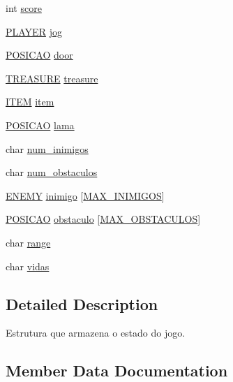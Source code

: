 \begin{DoxyCompactItemize}
\item 
int \hyperlink{structestado_a47e99ef4241dfe72d9d68244a68adb46}{score}
\item 
\hyperlink{estado_8h_a1c5dfb515f896e023ef1ab976a7d9e55}{P\+L\+A\+Y\+ER} \hyperlink{structestado_aba384d85c8fd0406b06aa2f478874bc1}{jog}
\item 
\hyperlink{estado_8h_a55b3f4b56938eeb8fa5e8f9c07baf1b0}{P\+O\+S\+I\+C\+AO} \hyperlink{structestado_a7415ebf0dc1fbc535407bb2bd669dc81}{door}
\item 
\hyperlink{estado_8h_a915d62cffb534f2a6557ce29c9c50624}{T\+R\+E\+A\+S\+U\+RE} \hyperlink{structestado_ae4cc2103608d31c5a97732cc6411334a}{treasure}
\item 
\hyperlink{structitemState}{I\+T\+EM} \hyperlink{structestado_a2c147e6348aeaa62b05ff2109f0f2bf4}{item}
\item 
\hyperlink{estado_8h_a55b3f4b56938eeb8fa5e8f9c07baf1b0}{P\+O\+S\+I\+C\+AO} \hyperlink{structestado_a85a6f9c990b282dbc2f6c68d36a4462f}{lama}
\item 
char \hyperlink{structestado_a6fbc4a80c4f371036f264ecfe27e5f9e}{num\+\_\+inimigos}
\item 
char \hyperlink{structestado_ac1a8a541e2301189833c6f713c416063}{num\+\_\+obstaculos}
\item 
\hyperlink{estado_8h_a9f02ab0e6d0d32d23cd5f9f81e8c69f9}{E\+N\+E\+MY} \hyperlink{structestado_a85c620d8bd760efde2d2681df831dcb2}{inimigo} \mbox{[}\hyperlink{estado_8h_aa97e6cbfdd94711688f1176cb8dd916a}{M\+A\+X\+\_\+\+I\+N\+I\+M\+I\+G\+OS}\mbox{]}
\item 
\hyperlink{estado_8h_a55b3f4b56938eeb8fa5e8f9c07baf1b0}{P\+O\+S\+I\+C\+AO} \hyperlink{structestado_a970dc20c6687acb17c3f08c06edbed4f}{obstaculo} \mbox{[}\hyperlink{estado_8h_ac574e2817856ecc9a890d2d47cb9d783}{M\+A\+X\+\_\+\+O\+B\+S\+T\+A\+C\+U\+L\+OS}\mbox{]}
\item 
char \hyperlink{structestado_a813cb0f2927179b6139566f846c77018}{range}
\item 
char \hyperlink{structestado_a1dcd7329b4a4cd561a7b72b2552f1d6c}{vidas}
\end{DoxyCompactItemize}


\subsection{Detailed Description}
Estrutura que armazena o estado do jogo. 

\subsection{Member Data Documentation}
